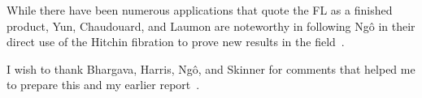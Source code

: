 \documentclass[brochure,english,12pt]{bourbaki}
\begin{document}

While there have been numerous applications that quote the FL as a
finished product, Yun, Chaudouard, and Laumon are noteworthy in
following Ng\^o in their direct use of the Hitchin fibration to prove
new results in the field~\cite{Yun:2009}.


I wish to thank Bhargava, Harris, Ng\^o, and Skinner for comments that
helped me to prepare this and my earlier report~\cite{thales:NBC:2011}.
 

\raggedright

\end{document}
